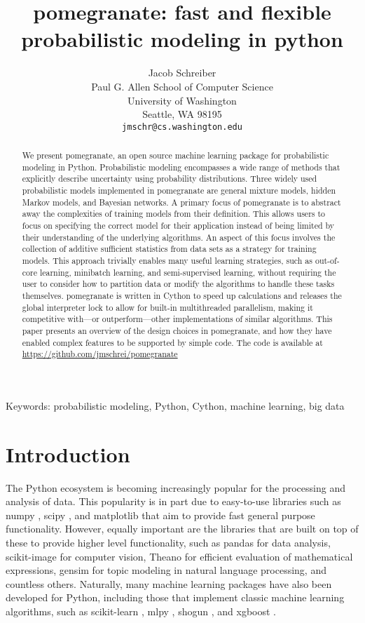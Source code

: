 \documentclass{article}
\title{pomegranate: fast and flexible probabilistic modeling in python}
\author{
  Jacob Schreiber \\
  Paul G. Allen School of Computer Science \\
  University of Washington \\
  Seattle, WA 98195\\
  \texttt{jmschr@cs.washington.edu} \\
}
\begin{document}
 
\maketitle

\begin{abstract}
We present pomegranate, an open source machine learning package for probabilistic modeling in Python. Probabilistic modeling encompasses a wide range of methods that explicitly describe uncertainty using probability distributions. Three widely used probabilistic models implemented in pomegranate are general mixture models, hidden Markov models, and Bayesian networks. A primary focus of pomegranate is to abstract away the complexities of training models from their definition. This allows users to focus on specifying the correct model for their application instead of being limited by their understanding of the underlying algorithms. An aspect of this focus involves the collection of additive sufficient statistics from data sets as a strategy for training models. This approach trivially enables many useful learning strategies, such as out-of-core learning, minibatch learning, and semi-supervised learning, without requiring the user to consider how to partition data or modify the algorithms to handle these tasks themselves. pomegranate is written in Cython to speed up calculations and releases the global interpreter lock to allow for built-in multithreaded parallelism, making it competitive with---or outperform---other implementations of similar algorithms. This paper presents an overview of the design choices in pomegranate, and how they have enabled complex features to be supported by simple code. The code is available at \url{https://github.com/jmschrei/pomegranate}
\end{abstract}

Keywords: probabilistic modeling, Python, Cython, machine learning, big data

\section{Introduction}
The Python ecosystem is becoming increasingly popular for the processing and analysis of data. This popularity is in part due to easy-to-use libraries such as numpy \citep{numpy}, scipy \citep{scipy}, and matplotlib \citep{matplotlib} that aim to provide fast general purpose functionality. However, equally important are the libraries that are built on top of these to provide higher level functionality, such as pandas \citep{pandas} for data analysis, scikit-image \citep{scikit-image} for computer vision, Theano \citep{theano} for efficient evaluation of mathematical expressions, gensim \citep{gensim} for topic modeling in natural language processing, and countless others. Naturally, many machine learning packages have also been developed for Python, including those that implement classic machine learning algorithms, such as scikit-learn \citep{scikit-learn}, mlpy \citep{mlpy}, shogun \citep{shogun}, and xgboost \citep{xgboost}.
\end{document}

